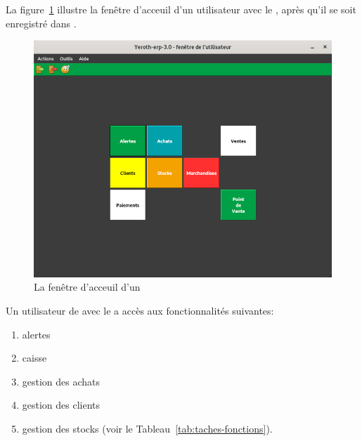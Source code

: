\label{sec:utilisateurs-vendeur}

La figure~\ref{fig:yeren-fenetre-vendeur} illustre la fen\^etre
d'acceuil d'un utilisateur avec le \role \vendeur, 
apr\`es qu'il se soit enregistr\'e dans \yeren.\\

\begin{figure}[!htbp]
\centering
\includegraphics[scale=0.63]{images/yeroth-fenetre-vendeur.png}
\caption{La fen\^etre d'acceuil d'un \vendeur}
\label{fig:yeren-fenetre-vendeur}
\end{figure}

Un utilisateur de \yeren avec le \role \vendeur a acc\`es
aux fonctionnalit\'es suivantes:
\begin{enumerate}[1)]
	\item alertes
	\item caisse
	\item gestion des achats
	\item gestion des clients
	\item gestion des stocks (voir le Tableau~\ref{tab:taches-fonctions}).\\
\end{enumerate}

